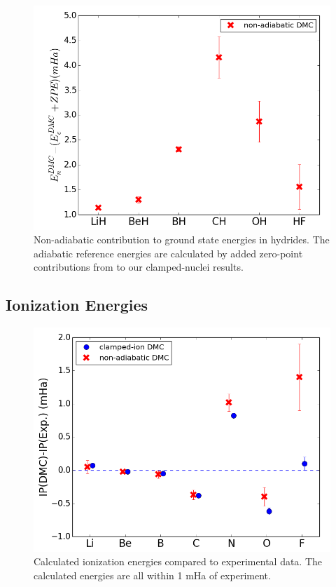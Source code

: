 \documentclass[pra,superscriptaddress,groupedaddress,twocolumn]{revtex4}
\begin{document}
\begin{figure}
\includegraphics[scale=.4]{Figures/hydride-ZPE}
\caption{Non-adiabatic contribution to ground state energies in hydrides. The adiabatic reference energies are calculated by added zero-point contributions from \cite{Feller_Corrections} to our clamped-nuclei results.}
\end{figure}

\subsection{Ionization Energies}

\begin{figure}[h]
\centering
\includegraphics[scale=.4]{Figures/ionization}
\caption{Calculated ionization energies compared to experimental data. The calculated energies are all within 1 mHa of experiment.}
\end{figure}
\end{document}
